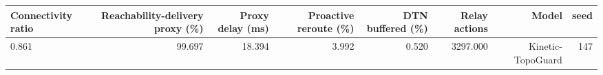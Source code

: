 \begin{tabular}{lrrrrrrr}
\toprule
Connectivity ratio & Reachability-delivery proxy (\%) & Proxy delay (ms) & Proactive reroute (\%) & DTN buffered (\%) & Relay actions & Model & seed \\
\midrule
0.861 & 99.697 & 18.394 & 3.992 & 0.520 & 3297.000 & Kinetic-TopoGuard & 147 \\
\bottomrule
\end{tabular}